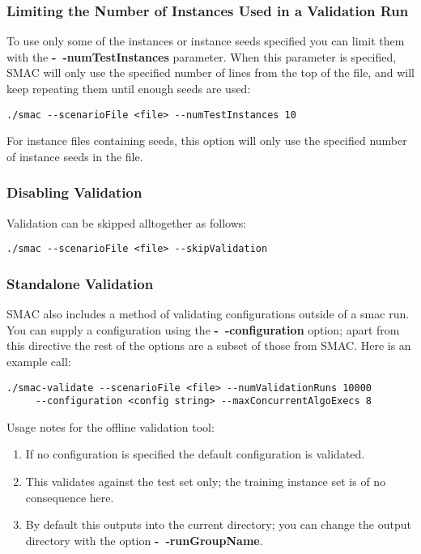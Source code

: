 \subsubsection{Limiting the Number of Instances Used in a Validation Run}

To use only some of the instances or instance seeds specified you can limit them with the \textbf{-~$\!$-numTestInstances} parameter. When this parameter is specified, SMAC will only use the specified number of lines from the top of the file, and will keep repeating them until enough seeds are used: 
\begin{verbatim}
./smac --scenarioFile <file> --numTestInstances 10
\end{verbatim}
For instance files containing seeds, this option will only use the specified number of instance seeds in the file.

\subsubsection{Disabling Validation}
Validation can be skipped alltogether as follows:
\begin{verbatim}
./smac --scenarioFile <file> --skipValidation
\end{verbatim}

\subsubsection{Standalone Validation}
SMAC also includes a method of validating configurations outside of a smac run.
You can supply a configuration using the \textbf{-~$\!$-configuration} option; apart from this directive the rest of the options are a subset of those from SMAC.
Here is an example call:
\begin{verbatim}
./smac-validate --scenarioFile <file> --numValidationRuns 10000 
     --configuration <config string> --maxConcurrentAlgoExecs 8
\end{verbatim}
%
Usage notes for the offline validation tool:
\begin{enumerate}
\item If no configuration is specified the default configuration is validated.
\item This validates against the test set only; the training instance set is of no consequence here.
\item By default this outputs into the current directory; you can change the output directory with the option \textbf{-~$\!$-runGroupName}.
\end{enumerate}

